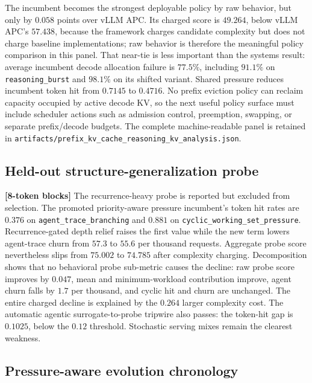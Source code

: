 \documentclass[11pt]{article}
\newcommand{\filepath}[1]{\nolinkurl{#1}}
\newcommand{\identifier}[1]{\nolinkurl{#1}}
\newcommand{\blocktag}[1]{\textbf{\color{navy}[#1-token blocks]}}
\begin{document}
The incumbent becomes the strongest deployable policy by raw behavior, but only by
\(0.058\) points over vLLM APC.  Its charged score is \(49.264\), below vLLM APC's
\(57.438\), because the framework charges candidate complexity but does not charge
baseline implementations; raw behavior is therefore the meaningful policy comparison
in this panel.  That near-tie is less important than the systems result: average
incumbent decode allocation failure is \(77.5\%\), including \(91.1\%\) on
\identifier{reasoning_burst} and \(98.1\%\) on its shifted variant.  Shared pressure
reduces incumbent token hit from \(0.7145\) to \(0.4716\).  No prefix eviction policy
can reclaim capacity occupied by active decode KV, so the next useful policy surface
must include scheduler actions such as admission control, preemption, swapping, or
separate prefix/decode budgets.  The complete machine-readable panel is retained in
\filepath{artifacts/prefix_kv_cache_reasoning_kv_analysis.json}.

\subsection{Held-out structure-generalization probe}

\blocktag{8} The recurrence-heavy probe is reported but excluded from selection.  The
promoted priority-aware pressure incumbent's token hit rates are \(0.376\) on
\identifier{agent_trace_branching} and \(0.881\) on
\identifier{cyclic_working_set_pressure}. Recurrence-gated depth relief raises the
first value while the new term lowers agent-trace churn from \(57.3\) to \(55.6\) per
thousand requests.  Aggregate probe score nevertheless slips from \(75.002\) to
\(74.785\) after complexity charging.  Decomposition shows that no behavioral probe
sub-metric causes the decline: raw probe score improves by \(0.047\), mean and
minimum-workload contribution improve, agent churn falls by \(1.7\) per thousand, and
cyclic hit and churn are unchanged.  The entire charged decline is explained by the
\(0.264\) larger complexity cost.  The automatic agentic surrogate-to-probe tripwire
also passes: the token-hit gap is \(0.1025\), below the \(0.12\) threshold.
Stochastic serving mixes remain the clearest weakness.

\subsection{Pressure-aware evolution chronology}
\label{sec:pressure-aware-promotion}
\end{document}

